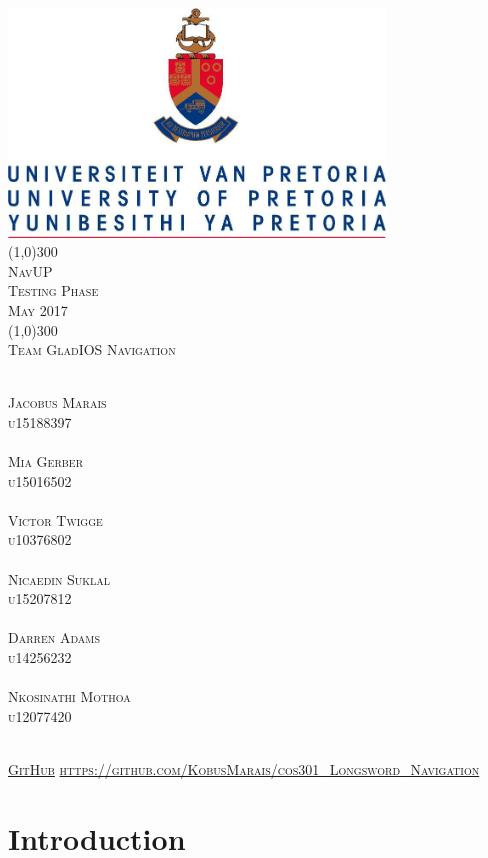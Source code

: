 \documentclass[runningheads,a4paper]{article}
\begin{document}
\begin{titlepage}
\begin{center}
\includegraphics[width=10cm]{UP.jpg}  \\
[1cm]
\line(1,0){300} \\
[0.3cm]
\textsc{\Large
NavUP \\
Testing Phase \\
\hfill {} May 2017
}\\
[0.1cm]
\line(1,0){300} \\
[0.7cm]
\textsc{\Large
Team GladIOS Navigation
} \\
\end{center}
\begin{center}
\begin{multicols}{2}
\textsc{\large\\
Jacobus Marais\\ 
u15188397\\ 
}
\textsc{\large\\
Mia Gerber\\
u15016502\\ 
}
\textsc{\large\\
Victor Twigge\\
u10376802\\ 
}
\columnbreak
\textsc{\large\\
Nicaedin Suklal\\
u15207812\\
}
\textsc{\large\\
Darren Adams\\
u14256232\\
}
\textsc{\large\\
Nkosinathi Mothoa\\
u12077420\\
}
\end{multicols}
\textsc{	\\ \href{https://github.com/KobusMarais/cos301_Longsword_Navigation}{GitHub}
\url{https://github.com/KobusMarais/cos301_Longsword_Navigation}}
\end{center}
\end{titlepage}




\begingroup



\tableofcontents


\endgroup

\newpage

\section{Introduction}
\end{document}
